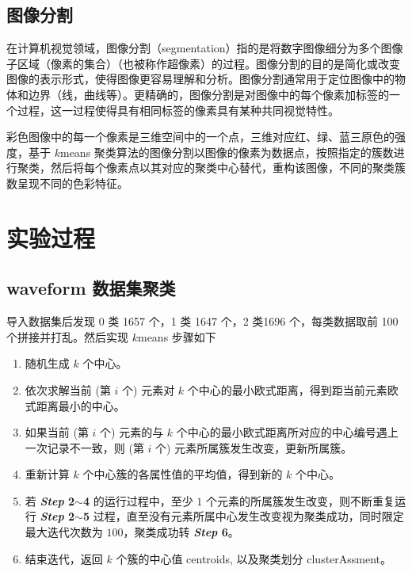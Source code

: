 \documentclass[12pt,AutoFakeBold]{article}
\begin{document}
\subsection{图像分割}

在计算机视觉领域，图像分割（segmentation）指的是将数字图像细分为多个图像子区域（像素的集合）（也被称作超像素）的过程。图像分割的目的是简化或改变图像的表示形式，使得图像更容易理解和分析。图像分割通常用于定位图像中的物体和边界（线，曲线等）。更精确的，图像分割是对图像中的每个像素加标签的一个过程，这一过程使得具有相同标签的像素具有某种共同视觉特性。

彩色图像中的每一个像素是三维空间中的一个点，三维对应红、绿、蓝三原色的强度，基于 $k$means 聚类算法的图像分割以图像的像素为数据点，按照指定的簇数进行聚类，然后将每个像素点以其对应的聚类中心替代，重构该图像，不同的聚类簇数呈现不同的色彩特征。

\section{实验过程}

\subsection{waveform 数据集聚类}

导入数据集后发现 0 类 1657 个，1 类 1647 个，2 类1696 个，每类数据取前 100 个拼接并打乱。然后实现 $k$means 步骤如下

\begin{enumerate}
\renewcommand{\labelenumi}{\bfseries \textit{Step} \theenumi.}

\item 随机生成 $k$ 个中心。

\item 依次求解当前 (第 $i$ 个) 元素对 $k$ 个中心的最小欧式距离，得到距当前元素欧式距离最小的中心。

\item 如果当前 (第 $i$ 个) 元素的与 $k$ 个中心的最小欧式距离所对应的中心编号遇上一次记录不一致，则 (第 $i$ 个) 元素所属簇发生改变，更新所属簇。

\item 重新计算 $k$ 个中心簇的各属性值的平均值，得到新的 $k$ 个中心。

\item 若 \textbf{\textit{Step} 2$\sim$4} 的运行过程中，至少 $1$ 个元素的所属簇发生改变，则不断重复运行 \textbf{\textit{Step} 2$\sim$5} 过程，直至没有元素所属中心发生改变视为聚类成功，同时限定最大迭代次数为 $100$，聚类成功转 \textbf{\textit{Step} 6}。

\item 结束迭代，返回 $k$ 个簇的中心值 centroids, 以及聚类划分 clusterAssment。
\end{enumerate}
\end{document}
